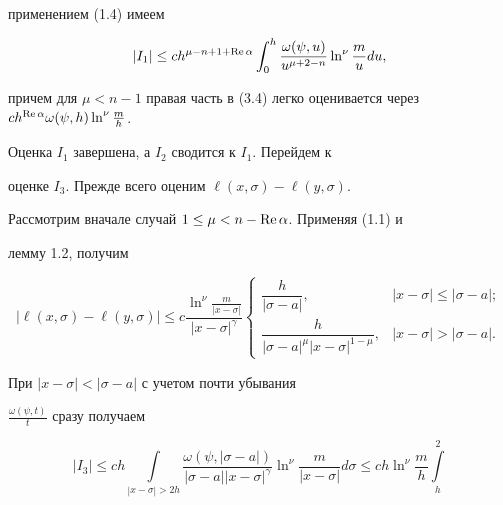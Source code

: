 \begin{pf}
применением (1.4) имеем


\begin{equation}


|I_1| \le ch^{\mu-n+1+\re \alpha} \int_0^h


\frac{\omega(\psi,u)}


{u^{\mu+2-n}} \ln^\nu \frac{m}{u} du,


\end{equation}


причем для $\mu < n-1$ правая часть в (3.4) легко оценивается через $c


h^{\re \alpha} \omega(\psi,h) \ln^\nu \frac{m}{h}$.





Оценка $I_1$ завершена, а $I_2$ сводится к $I_1$. Перейдем к


оценке $I_3$. Прежде всего оценим $ \ell(x,\sigma) - \ell(y,\sigma )$.


Рассмотрим вначале случай $1 \le \mu < n-\operatorname{Re} \alpha$. Применяя (1.1) и


лемму 1.2, получим


\begin{equation}


|\ell(x,\sigma) - \ell(y,\sigma )| \le c \frac{\ln^\nu \frac{m}


{|x-\sigma|}}{|x-\sigma|^\gamma}


\begin{cases}


\dfrac{h}{|\sigma-a|}, & |x-\sigma| \leq |\sigma-a|; \\[3mm]


\dfrac{h}{|\sigma-a|^\mu |x-\sigma|^{1-\mu}}, & |x-\sigma|>|\sigma-a|.


\end{cases}


\end{equation}





При $|x-\sigma| < |\sigma-a|$ с учетом почти убывания


$\frac{\omega(\psi,t)}{t}$ сразу получаем


\begin{equation}


|I_3|\le ch \int \limits_{|x-\sigma|>2h} \frac{\omega(\psi, |\sigma-


a|)}{|\sigma-a| |x-\sigma|^\gamma} \ln^\nu \frac{m}{|x-\sigma|} d\sigma


\le ch \ln^\nu \frac{m}{h} \int \limits_{h}^2



\end{equation}
\end{pf}
